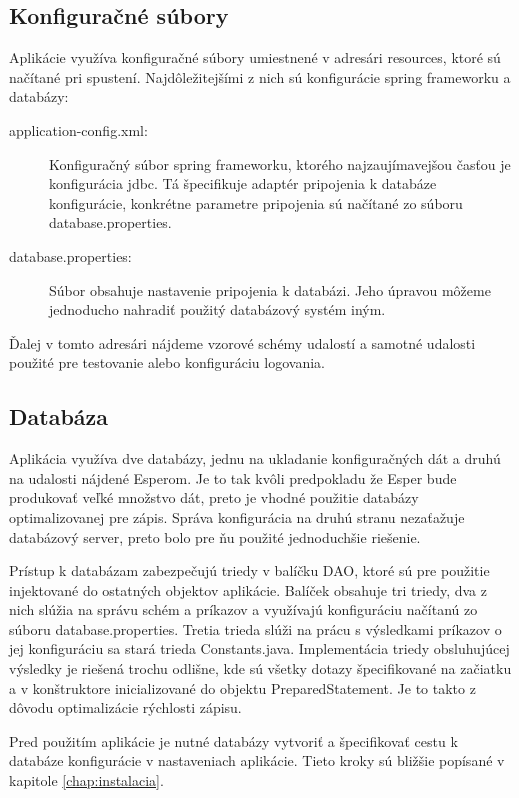 	\subsection{Konfiguračné súbory}
		Aplikácie využíva konfiguračné súbory umiestnené v adresári resources, ktoré sú načítané pri spustení. Najdôležitejšími z nich sú konfigurácie spring frameworku a databázy:
		\begin{description}
			\item[application-config.xml:] Konfiguračný súbor spring frameworku, ktorého najzaujímavejšou časťou je konfigurácia jdbc. Tá špecifikuje adaptér pripojenia k databáze konfigurácie, konkrétne parametre pripojenia sú načítané zo súboru database.properties.
			\item[database.properties:] Súbor obsahuje nastavenie pripojenia k databázi. Jeho úpravou môžeme jednoducho nahradiť použitý databázový systém iným.
		\end{description}
		Ďalej v tomto adresári nájdeme vzorové schémy udalostí a samotné udalosti použité pre testovanie alebo konfiguráciu logovania.
	
	\subsection{Databáza}
		Aplikácia využíva dve databázy, jednu na ukladanie konfiguračných dát a druhú na udalosti nájdené Esperom. Je to tak kvôli predpokladu že Esper bude produkovať veľké množstvo dát, preto je vhodné použitie databázy optimalizovanej pre zápis.
		Správa konfigurácia na druhú stranu nezaťažuje databázový server, preto bolo pre ňu použité jednoduchšie riešenie.
		
		Prístup k databázam zabezpečujú triedy v balíčku DAO, ktoré sú pre použitie injektované do ostatných objektov aplikácie. Balíček obsahuje tri triedy, dva z nich slúžia na správu schém a príkazov a využívajú konfiguráciu načítanú zo súboru database.properties. Tretia trieda slúži na prácu s výsledkami príkazov o jej konfiguráciu sa stará trieda Constants.java. Implementácia triedy obsluhujúcej výsledky je riešená trochu odlišne, kde sú všetky dotazy špecifikované na začiatku a v konštruktore inicializované do objektu PreparedStatement. Je to takto z dôvodu optimalizácie rýchlosti zápisu.			
		
		Pred použitím aplikácie je nutné databázy vytvoriť a špecifikovať cestu k databáze konfigurácie v nastaveniach aplikácie. Tieto kroky sú bližšie popísané v kapitole \ref{chap:instalacia}.
	
